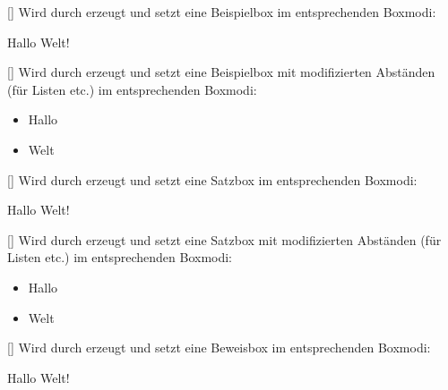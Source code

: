 %
%
%

[]
Wird durch  erzeugt und setzt eine Beispielbox im entsprechenden Boxmodi:
\begin{latex}
\begin{beispiel}[Hallo]
   Hallo Welt!
\end{beispiel}
\end{latex}

%
%
%

[]
Wird durch  erzeugt und setzt eine Beispielbox mit modifizierten Abständen (für Listen etc.) im entsprechenden Boxmodi:
\begin{latex}
\begin{beispiel*}[Hallo]
   \begin{itemize}
       \item Hallo
       \item Welt
   \end{itemize}
\end{beispiel*}
\end{latex}

%
%
%

[]
Wird durch  erzeugt und setzt eine Satzbox im entsprechenden Boxmodi:
\begin{latex}
\begin{satz}[Hallo]
   Hallo Welt!
\end{satz}
\end{latex}

%
%
%

[]
Wird durch  erzeugt und setzt eine Satzbox mit modifizierten Abständen (für Listen etc.) im entsprechenden Boxmodi:
\begin{latex}
\begin{satz*}[Hallo]
   \begin{itemize}
       \item Hallo
       \item Welt
   \end{itemize}
\end{satz*}
\end{latex}

%
%
%

[]
Wird durch  erzeugt und setzt eine Beweisbox im entsprechenden Boxmodi:
\begin{latex}
\begin{beweis}[Hallo]
   Hallo Welt!
\end{beweis}
\end{latex}

